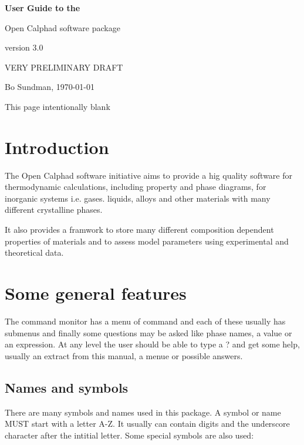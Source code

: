 \documentclass[12pt]{article}
\begin{document}
\begin{center}

{\Huge \bf User Guide to the 

Open Calphad software package

version 3.0

}

\bigskip

VERY PRELIMINARY DRAFT

Bo Sundman, \today

\end{center}

\newpage

This page intentionally blank

\newpage

\tableofcontents

\newpage

\section{Introduction}

The Open Calphad software initiative aims to provide a hig quality
software for thermodynamic calculations, including property and phase
diagrams, for inorganic systems i.e.  gases. liquids, alloys and other
materials with many different crystalline phases.

It also provides a framwork to store many different composition
dependent properties of materials and to assess model parameters using
experimental and theoretical data.

\section{Some general features}

The command monitor has a menu of command and each of these usually
has submenus and finally some questions may be asked like phase names,
a value or an expression.  At any level the user should be able to
type a ? and get some help, usually an extract from this manual, a
menue or possible answers.

\subsection{Names and symbols}

There are many symbols and names used in this package.  A symbol or
name MUST start with a letter A-Z.  It usually can contain digits and
the underscore character after the intitial letter.  Some special
symbols are also used:
\end{document}
